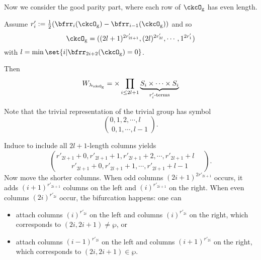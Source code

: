 \documentclass[12pt]{amsart}
\numberwithin{equation}{section}
\theoremstyle{remark}
\def\half{{\tfrac{1}{2}}}
\def\lamckg{\lambda_{\ckcO_{\mathrm g}}}
\begin{document}
{{      Now we consider the good parity part, where each row of $\ckcO_{\mathrm g}$ has
      even length.

      Assume $r'_{i} := \half(\bfrr_{i}(\ckcO_{\mathrm g})-\bfrr_{i-1}(\ckcO_{\mathrm g}))$ and
      so
      \[
        \ckcO_{\mathrm g} %
        = ((2l+1)^{2r'_{2l+1}}, (2l)^{2r'_{2l}},\cdots, 1^{2r'_{1}})
      \]
      with $l =\min\set{i|\bfrr_{2i+2}(\ckcO_{\mathrm g}) = 0}$.

      Then
      \[
        W_{\lamckg} = \times \prod_{i\leq 2l+1} \underbrace{S_{i}\times \cdots\times S_{i}}_{r'_{i}\text{-terms}}
      \]

      Note that the trivial representation of the trivial group has symbol
      \[
        \binom{0,1, 2, \cdots, l\phantom{-1}}{0,1, \cdots, l-1}.
      \]


      Induce to include all $2l+1$-length columns yields
      \[
        \binom{r'_{2l+1}+0,r'_{2l+1}+1,r'_{2l+1}+2,\cdots, r'_{2l+1}+l\phantom{-1}}{ r'_{2l+1}+0,r'_{2l+1}+1, \cdots, r'_{2l+1}+l-1}.
      \]
      Now move the shorter columns. When odd columns $(2i+1)^{2r'_{2i+1}}$
      occurs, it adds $(i+1)^{r'_{2i+1}}$ columns on the left and
      $(i)^{r'_{2i+1}}$ on the right. When even columns $(2i)^{r'_{2i}}$ occur,
      the bifurcation happens: one can
      \begin{itemize}
        \item attach columns $(i)^{r'_{2i}}$ on the left and columns
              $(i)^{r'_{2i}}$ on the right, which corresponds to
              $(2i,2i+1)\neq \wp$, or
        \item attach columns $(i-1)^{r'_{2i}}$ on the left and columns
              $(i+1)^{r'_{2i}}$ on the right, which corresponds to
              $(2i,2i+1)\in \wp$.
      \end{itemize}


}}
\end{document}
